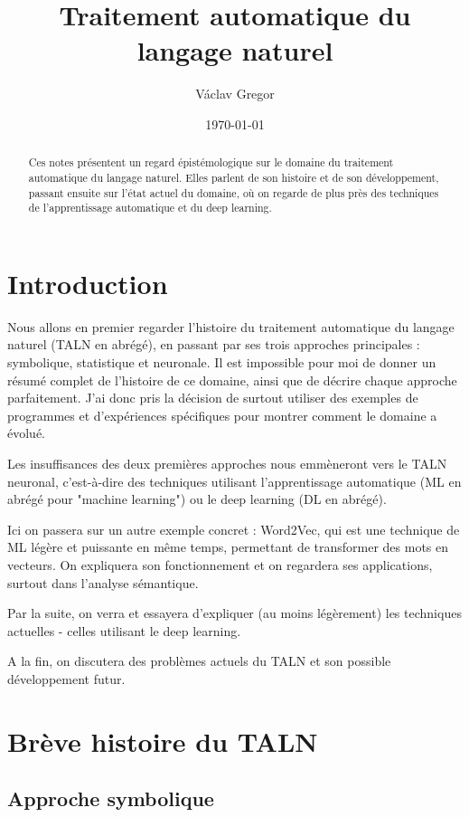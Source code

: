 \documentclass[11pt, a4paper]{report}
\title{Traitement automatique du langage naturel}
\author{Václav Gregor}
\date{\today}
\begin{document}
\maketitle
\tableofcontents


\begin{abstract}
  Ces notes présentent un regard épistémologique sur le domaine du traitement automatique du 
  langage naturel. Elles parlent de son histoire et de son développement, passant ensuite 
  sur l'état actuel du domaine, où on regarde de plus près 
  des techniques de l'apprentissage automatique et du deep learning.
\end{abstract}


\chapter{Introduction}
  Nous allons en premier regarder l'histoire du traitement automatique du langage 
  naturel (TALN en abrégé), en passant par ses 
  trois approches principales : symbolique, statistique et neuronale. 
  Il est impossible pour moi de donner un résumé complet de l'histoire de ce domaine, 
  ainsi que de décrire chaque approche parfaitement. J'ai donc pris la décision de surtout 
  utiliser des exemples de programmes et d'expériences spécifiques pour montrer 
  comment le domaine a évolué. 

  Les insuffisances des deux premières approches nous emmèneront vers le TALN neuronal, 
  c'est-à-dire des techniques utilisant l'apprentissage automatique (ML en abrégé pour "machine learning") ou 
  le deep learning (DL en abrégé).  
  
  Ici on passera sur un autre exemple concret : Word2Vec, qui est une technique de ML légère et 
  puissante en même temps, permettant de transformer des mots en vecteurs. 
  On expliquera son fonctionnement et on regardera ses applications, surtout dans l'analyse
  sémantique.

  Par la suite, on verra et essayera d'expliquer (au moins légèrement) les techniques actuelles - celles utilisant le deep learning.  
  
  A la fin, on discutera des problèmes actuels du TALN et son possible développement futur.  
\chapter{Brève histoire du TALN}
  \section{Approche symbolique}
\end{document}
